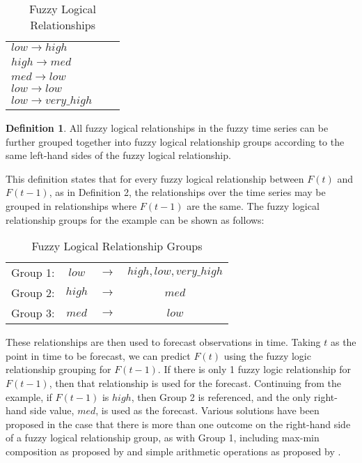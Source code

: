 \documentclass{article}
\theoremstyle{definition}
\newtheorem{ftsdef}{Definition}
\begin{document}
\begin{table}[h]
	\center
	\begin{tabular}{ l l l }
  	$low \rightarrow high$  \\
  	$high \rightarrow med$ \\
  	$med \rightarrow low$ \\
  	$low \rightarrow low$ \\
  	$low \rightarrow very\_high$ \\
	\end{tabular}
	\caption{Fuzzy Logical Relationships}
\end{table}

\begin{ftsdef}
\label{def3}
All fuzzy logical relationships in the fuzzy time series can be further grouped together into fuzzy logical relationship groups according to the same left-hand sides of the fuzzy logical relationship.
\end{ftsdef}

This definition states that for every fuzzy logical relationship between $F(t)$ and $F(t-1)$, as in Definition 2, the relationships over the time series may be grouped in relationships where $F(t-1)$ are the same. The fuzzy logical relationship groups for the example can be shown as follows:

\begin{table}[h]
	\center
	\begin{tabular}{ c c c c }
  	Group 1: & $low$ & $\rightarrow$ & $high, low, very\_high$ \\
  	Group 2: & $high$ & $\rightarrow$ & $med$ \\
  	Group 3: & $med$ & $\rightarrow$ & $low$ \\
	\end{tabular}
	\caption{Fuzzy Logical Relationship Groups}
\end{table}

These relationships are then used to forecast observations in time. Taking $t$ as the point in time to be forecast, we can predict $F(t)$ using the fuzzy logic relationship grouping for $F(t-1)$. If there is only 1 fuzzy logic relationship for $F(t-1)$, then that relationship is used for the forecast. Continuing from the example, if $F(t-1)$ is $high$, then Group 2 is referenced, and the only right-hand side value, $med$, is used as the forecast. Various solutions have been proposed in the case that there is more than one outcome on the right-hand side of a fuzzy logical relationship group, as with Group 1, including max-min composition as proposed by \cite{song1993forecasting} and simple arithmetic operations as proposed by \cite{chen1996forecasting}.
\end{document}
